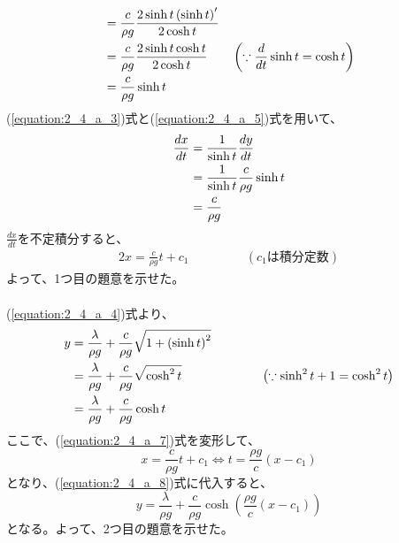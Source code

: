 \begin{enumerate}
\begin{alignat}{2}
    &= \frac{c}{\rho g} \frac{2 \sinh{t} \left(\sinh{t}\right)^{\prime}}{2 \cosh{t}} & & \notag\\
    &= \frac{c}{\rho g} \frac{2 \sinh{t} \cosh{t}}{2 \cosh{t}} & & \left(\because \frac{d}{dt} \sinh{t} = \cosh{t}\right) \notag\\
    &= \frac{c}{\rho g} \sinh{t} & & \notag \\
  \end{alignat}
  (\ref{equation:2_4_a_3})式と(\ref{equation:2_4_a_5})式を用いて、
  \begin{align}\label{equation:2_4_a_6}
    \frac{dx}{dt} &= \frac{1}{\sinh t} \frac{dy}{dt} \notag\\
    &= \frac{1}{\sinh t} \frac{c}{\rho g} \sinh{t} \notag\\
    &= \frac{c}{\rho g}
  \end{align}
  \(\frac{dx}{dt}\)を不定積分すると、
  \begin{alignat}{2}\label{equation:2_4_a_7}
    x = \frac{c}{\rho g} t + c_{1} & \quad \quad \quad & \left(c_{1}は積分定数\right)
  \end{alignat}
  よって、1つ目の題意を示せた。\\ \\

  (\ref{equation:2_4_a_4})式より、
  \begin{alignat}{2}\label{equation:2_4_a_8}
    y &= \frac{\lambda}{\rho g} + \frac{c}{\rho g}\sqrt{1 + \left(\sinh t\right)^2} & \quad \quad \quad & \notag\\
    &= \frac{\lambda}{\rho g} + \frac{c}{\rho g}\sqrt{\cosh^{2}{t}} & & \left(\because \sinh^{2}{t} + 1 = \cosh^{2}{t}\right) \notag\\
    &= \frac{\lambda}{\rho g} + \frac{c}{\rho g} \cosh{t} & &
  \end{alignat}
  ここで、(\ref{equation:2_4_a_7})式を変形して、
  \begin{equation}\label{equation:2_4_a_9}
    x = \frac{c}{\rho g} t + c_{1} \Leftrightarrow t = \frac{\rho g}{c} \left(x - c_{1}\right)
  \end{equation}
  となり、(\ref{equation:2_4_a_8})式に代入すると、
  \begin{equation}
    y = \frac{\lambda}{\rho g} + \frac{c}{\rho g} \cosh{\left(\frac{\rho g}{c} \left(x - c_{1}\right)\right)}
  \end{equation}
  となる。よって、2つ目の題意を示せた。

\end{enumerate}

